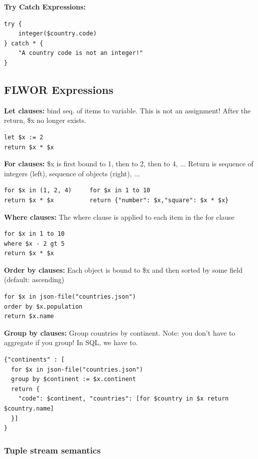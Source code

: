 \documentclass[11pt,oneside,a4paper]{article}
\begin{document}
{\textbf{Try Catch Expressions:}

\begin{lstlisting}
try {
	integer($country.code)
} catch * {
	"A country code is not an integer!"
}
\end{lstlisting}


\subsection{FLWOR Expressions}

\textbf{Let clauses:} bind seq. of items to variable. This is not an assignment! After the return, \$x no longer exists.

\begin{lstlisting}
let $x := 2
return $x * $x
\end{lstlisting}

\textbf{For clauses:} \$x is first bound to 1, then to 2, then to 4, ... Return is sequence of integers (left), sequence of objects (right), ...

\begin{lstlisting}
for $x in (1, 2, 4)		for $x in 1 to 10
return $x * $x			return {"number": $x,"square": $x * $x}
\end{lstlisting}

\textbf{Where clauses:} The where clause is applied to each item in the for clause 

\begin{lstlisting}
for $x in 1 to 10
where $x - 2 gt 5
return $x * $x
\end{lstlisting}

\textbf{Order by clauses:} Each object is bound to \$x and then sorted by some field (default: ascending)

\begin{lstlisting}
for $x in json-file("countries.json")
order by $x.population
return $x.name
\end{lstlisting}

\textbf{Group by clauses:} Group countries by continent. Note: you don't have to aggregate if you group! In SQL, we have to.

\begin{lstlisting}
{"continents" : [
  for $x in json-file("countries.json")
  group by $continent := $x.continent
  return {
    "code": $continent, "countries": [for $country in $x return $country.name]
  }]
}
\end{lstlisting}

\subsubsection{Tuple stream semantics}

}
\end{document}
